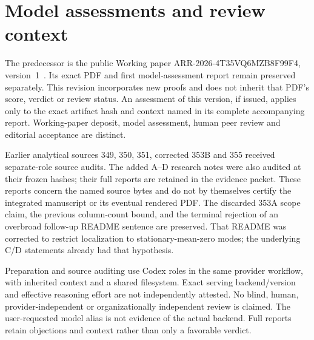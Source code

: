 \documentclass[11pt]{article}
\begin{document}
\section{Model assessments and review context}
The predecessor is the public Working paper ARR-2026-4T35VQ6MZB8F99F4, version~1~\cite{predecessor}. Its exact PDF and first model-assessment report remain preserved separately. This revision incorporates new proofs and does not inherit that PDF's score, verdict or review status. An assessment of this version, if issued, applies only to the exact artifact hash and context named in its complete accompanying report. Working-paper deposit, model assessment, human peer review and editorial acceptance are distinct.

Earlier analytical sources 349, 350, 351, corrected 353B and 355 received separate-role source audits. The added A--D research notes were also audited at their frozen hashes; their full reports are retained in the evidence packet. These reports concern the named source bytes and do not by themselves certify the integrated manuscript or its eventual rendered PDF. The discarded 353A scope claim, the previous column-count bound, and the terminal rejection of an overbroad follow-up README sentence are preserved. That README was corrected to restrict localization to stationary-mean-zero modes; the underlying C/D statements already had that hypothesis.

Preparation and source auditing use Codex roles in the same provider workflow, with inherited context and a shared filesystem. Exact serving backend/version and effective reasoning effort are not independently attested. No blind, human, provider-independent or organizationally independent review is claimed. The user-requested model alias is not evidence of the actual backend. Full reports retain objections and context rather than only a favorable verdict.
\end{document}
